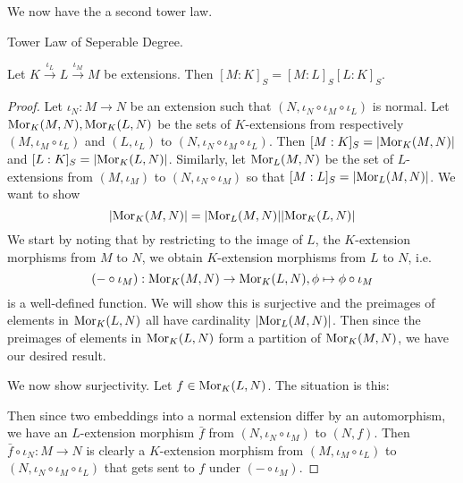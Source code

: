 \documentclass[../book.tex]{subfiles}
\begin{document}
We now have the a second tower law. 
\begin{thm} Tower Law of Seperable Degree. 
    
    Let $K \overset{\iota_L}{\to} L \overset{\iota_M}{\to} M$ be extensions.
    Then $[M : K]_S = [M : L]_S [L : K]_S$.
\end{thm}
\begin{proof}
    Let $\iota_N : M \to N$ be an extension such that 
    $(N,\iota_N\circ\iota_M\circ\iota_L)$ is normal. 
    Let $\text{Mor}_{K}(M, N), \text{Mor}_{K}(L, N)$ be the sets of $K$-extensions
    from respectively $(M,\iota_M\circ\iota_L)$ and $(L,\iota_L)$ 
    to $(N,\iota_N\circ\iota_M\circ\iota_L)$. 
    Then $[M:K]_S = |\text{Mor}_{K}(M, N)|$ and $[L:K]_S = |\text{Mor}_{K}(L, N)|$.
    Similarly, let $\text{Mor}_{L}(M, N)$ be the set of $L$-extensions
    from $(M,\iota_M)$ to $(N,\iota_N\circ\iota_M)$ so that 
    $[M:L]_S = |\text{Mor}_{L}(M, N)|$.
    We want to show \[
        |\text{Mor}_{K}(M, N)| = |\text{Mor}_{L}(M, N)| |\text{Mor}_{K}(L, N)|
    \]
    We start by noting that by restricting to the image of $L$, 
    the $K$-extension morphisms from $M$ to $N$,
    we obtain $K$-extension morphisms from $L$ to $N$, i.e.
    \[
        (- \circ \iota_M) : \text{Mor}_{K}(M, N) \to \text{Mor}_{K}(L, N), 
        \phi \mapsto \phi\circ\iota_M
    \]
    is a well-defined function. 
    We will show this is surjective and 
    the preimages of elements in $\text{Mor}_{K}(L, N)$ 
    all have cardinality $|\text{Mor}_{L}(M, N)|$.
    Then since the preimages of elements in $\text{Mor}_{K}(L, N)$ form
    a partition of $\text{Mor}_{K}(M, N)$, we have our desired result. 
    
    We now show surjectivity. 
    Let $f \in \text{Mor}_{K}(L, N)$. 
    The situation is this: \begin{figure}[H]
        \centering
    \end{figure}
    Then since two embeddings into a normal extension differ by an automorphism,
    we have an $L$-extension morphism $\bar{f}$ 
    from $(N,\iota_N\circ\iota_M)$ to $(N,f)$. 
    Then $\bar{f}\circ\iota_N : M \to N$ is clearly
    a $K$-extension morphism from $(M,\iota_M\circ\iota_L)$ 
    to $(N,\iota_N\circ\iota_M\circ\iota_L)$ 
    that gets sent to $f$ under $(- \circ \iota_M)$. 
    

\end{proof}
\end{document}
